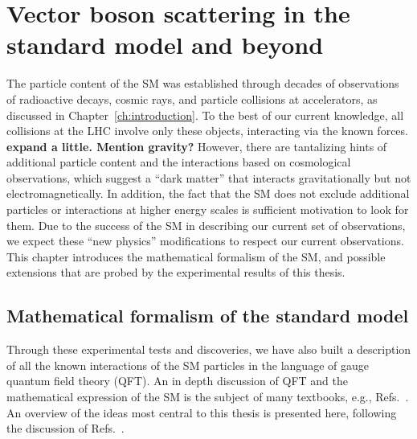 \chapter{Vector boson scattering in the standard model and beyond}
\label{ch:phenomenology}
The particle content of the SM was established through decades of
observations of radioactive decays, cosmic rays, and particle
collisions at accelerators, as discussed in Chapter~\ref{ch:introduction}. 
To the best of our
current knowledge, all collisions at the LHC involve only these objects,
interacting via the known forces.
\textbf{expand a little. Mention gravity?}
However, there are tantalizing hints of additional particle content and the 
interactions based on cosmological observations, which suggest a ``dark matter''
that interacts gravitationally but not electromagnetically. In addition, 
the fact that the SM does not exclude additional particles or interactions at
higher energy scales is sufficient motivation to look for them. Due to the success
of the SM in describing our current set of observations, we expect these
``new physics'' modifications to respect our current observations.
This chapter introduces the mathematical formalism of the SM, and possible
extensions that are probed by the experimental results of this thesis.

\section{Mathematical formalism of the standard model}

Through these experimental tests and
discoveries, we have also built a description of all the known interactions 
of the SM particles in the language of gauge quantum field theory (QFT).
An in depth discussion of QFT and the mathematical expression of the SM is
the subject of many textbooks, e.g., 
Refs.~\cite{Aitchison:2003tq,Srednicki:2007qs,Peskin:1995ev,Halzen:1984mc,Barger:1987nn}. 
An overview of the ideas
most central to this thesis is presented here, following the discussion
of Refs.~\cite{Quigg:2009vq,Peskin:1995ev}.

